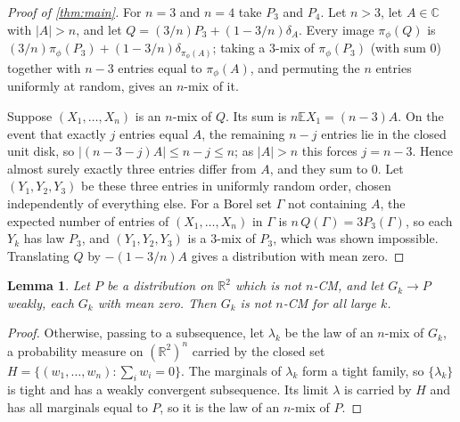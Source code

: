 \documentclass[11pt]{article}
\newtheorem{lemma}[theorem]{Lemma}
\theoremstyle{definition}
\theoremstyle{remark}
\newcommand{\R}{\mathbb{R}}
\newcommand{\C}{\mathbb{C}}
\newcommand{\E}{\mathbb{E}}
\begin{document}
\begin{proof}[Proof of \cref{thm:main}]
For $n=3$ and $n=4$ take $P_3$ and $P_4$. Let $n>3$, let $A\in\C$ with $|A|>n$, and let
$Q=(3/n)P_3+(1-3/n)\delta_A$. Every image $\pi_\phi(Q)$ is $(3/n)\pi_\phi(P_3)+(1-3/n)\delta_{\pi_\phi(A)}$; taking
a $3$-mix of $\pi_\phi(P_3)$ (with sum $0$) together with $n-3$ entries equal to $\pi_\phi(A)$, and permuting the $n$
entries uniformly at random, gives an $n$-mix of it.

Suppose $(X_1,\dots,X_n)$ is an $n$-mix of $Q$. Its sum is $n\E X_1=(n-3)A$. On the event that exactly $j$ entries
equal $A$, the remaining $n-j$ entries lie in the closed unit disk, so $|(n-3-j)A|\le n-j\le n$; as $|A|>n$ this
forces $j=n-3$. Hence almost surely exactly three entries differ from $A$, and they sum to $0$. Let $(Y_1,Y_2,Y_3)$
be these three entries in uniformly random order, chosen independently of everything else. For a Borel set $\Gamma$ not
containing $A$, the expected number of entries of $(X_1,\dots,X_n)$ in $\Gamma$ is $n\,Q(\Gamma)=3P_3(\Gamma)$, so each $Y_k$ has
law $P_3$, and $(Y_1,Y_2,Y_3)$ is a $3$-mix of $P_3$, which was shown impossible. Translating $Q$ by $-(1-3/n)A$
gives a distribution with mean zero.
\end{proof}

\begin{lemma}\label{lem:limit}
Let $P$ be a distribution on $\R^2$ which is not $n$-CM, and let $G_k\to P$ weakly, each $G_k$ with
mean zero. Then $G_k$ is not $n$-CM for all large $k$.
\end{lemma}

\begin{proof}
Otherwise, passing to a subsequence, let $\lambda_k$ be the law of an $n$-mix of $G_k$, a probability measure on
$(\R^2)^n$ carried by the closed set $H=\{(w_1,\dots,w_n):\sum_iw_i=0\}$. The marginals of $\lambda_k$ form a tight
family, so $\{\lambda_k\}$ is tight and has a weakly convergent subsequence. Its limit $\lambda$ is carried by $H$
and has all marginals equal to $P$, so it is the law of an $n$-mix of $P$.
\end{proof}
\end{document}
